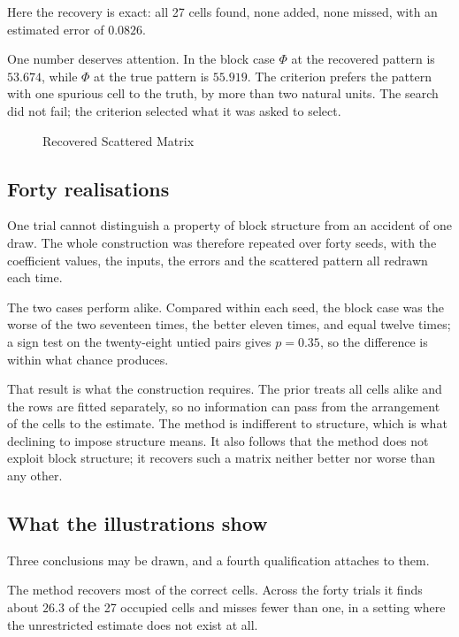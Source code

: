 Here the recovery is exact: all 27 cells found, none added, none missed, with an
estimated error of $0.0826$.

One number deserves attention. In the block case $\Phi$ at the recovered pattern is
$53.674$, while $\Phi$ at the true pattern is $55.919$. The criterion prefers the
pattern with one spurious cell to the truth, by more than two natural units. The
search did not fail; the criterion selected what it was asked to select.

\begin{figure}[ht]

\protect\caption{Recovered Scattered Matrix}
\label{fig:Recovered_Scattered_Matrix}
\end{figure}

\subsection{Forty realisations}

One trial cannot distinguish a property of block structure from an accident of one
draw. The whole construction was therefore repeated over forty seeds, with the
coefficient values, the inputs, the errors and the scattered pattern all redrawn each
time.



The two cases perform alike. Compared within each seed, the block case was the worse
of the two seventeen times, the better eleven times, and equal twelve times; a sign
test on the twenty-eight untied pairs gives $p = 0.35$, so the difference is within
what chance produces.

That result is what the construction requires. The prior treats all cells alike and
the rows are fitted separately, so no information can pass from the arrangement of the
cells to the estimate. The method is indifferent to structure, which is what declining
to impose structure means. It also follows that the method does not exploit block
structure; it recovers such a matrix neither better nor worse than any other.

\subsection{What the illustrations show}

Three conclusions may be drawn, and a fourth qualification attaches to them.

The method recovers most of the correct cells. Across the forty trials it finds about
$26.3$ of the 27 occupied cells and misses fewer than one, in a setting where the
unrestricted estimate does not exist at all.

